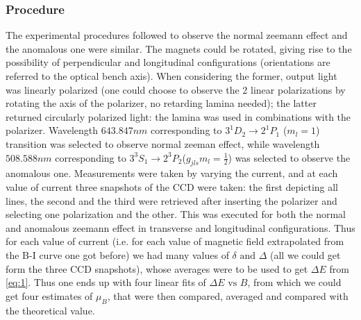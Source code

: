 \documentclass[a4paper,12pt,abstracton]{scrartcl}
\begin{document}
\subsubsection{Procedure} \label{subsec:1}
The experimental procedures followed to observe the normal zeemann effect and the anomalous one were similar. The magnets could be rotated, giving rise to the possibility of perpendicular and longitudinal configurations (orientations are referred to the optical bench axis). When considering the former, output light was linearly polarized (one could choose to observe the 2 linear polarizations by rotating the axis of the polarizer, no retarding lamina needed); the latter returned circularly polarized light: the lamina was used in combinations with the polarizer.
Wavelength $643.847 nm$ corresponding to $3 ^{1}D_{2} \longrightarrow 2 ^{1}P_{1}$ ($m_l =1$) transition was selected to observe normal zeeman effect, while wavelength $508.588 nm$ corresponding to $3 ^3S_1 \longrightarrow 2 ^3P_2$($g_{jls}m_l = \frac{1}{2}$) was selected to observe the anomalous one. \newline
Measurements were taken by varying the current, and at each value of current three snapshots of the CCD were taken: the first depicting all lines, the second and the third were retrieved after inserting the polarizer and selecting one polarization and the other. This was executed for both the normal and anomalous zeemann effect in transverse and longitudinal configurations.\newline
Thus for each value of current (i.e. for each value of magnetic field extrapolated from the B-I curve one got before) we had many values of $\delta \text{ and } \Delta $ (all we could get form the three CCD snapshots), whose averages were to be used to get $\Delta E$ from \ref{eq:1}.
Thus one ends up with four linear fits of $\Delta E \text{ vs } B$, from which we could get four estimates of $\mu_B$, that were then compared, averaged and compared with the theoretical value. 
  
\setlength{\columnsep}{27pt} 
\begin{multicols}{2}
\printnomenclature
\end{multicols}
\newpage


%
%
\end{document}
